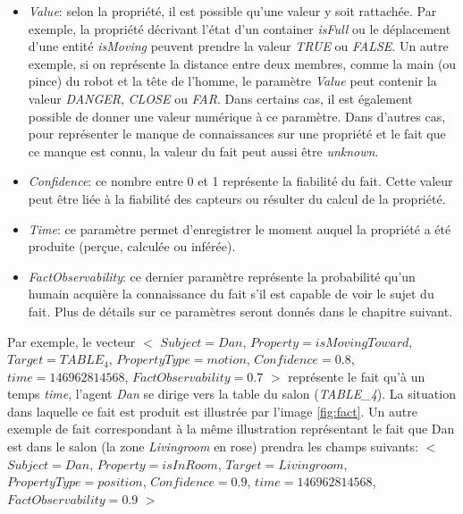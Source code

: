 \documentclass[a4paper,11pt,twoside]{StyleThese}
\begin{document}
\begin{itemize}
\item \textit{Value}: selon la propriété, il est possible qu'une valeur y soit rattachée. Par exemple, la propriété décrivant l'état d'un container \textit{isFull} ou le déplacement d'une entité \textit{isMoving} peuvent prendre la valeur \textit{TRUE} ou \textit{FALSE}. Un autre exemple, si on représente la distance entre deux membres, comme la main (ou pince) du robot et la tête de l'homme, le paramètre \textit{Value} peut contenir la valeur \textit{DANGER}, \textit{CLOSE} ou \textit{FAR}. Dans certains cas, il est également possible de donner une valeur numérique à ce paramètre.
Dans d'autres cas, pour représenter le manque de connaissances sur une propriété et le fait que ce manque est connu, la valeur du fait peut aussi être \textit{unknown}.
\item \textit{Confidence}: ce nombre entre 0 et 1 représente la fiabilité du fait. Cette valeur peut être liée à la fiabilité des capteurs ou résulter du calcul de la propriété.
\item \textit{Time}: ce paramètre permet d'enregistrer le moment auquel la propriété a été produite (perçue, calculée ou inférée).
\item \textit{FactObservability}: ce dernier paramètre représente la probabilité qu'un humain acquière la connaissance du fait s'il est capable de voir le sujet du fait. Plus de détails sur ce paramètres seront donnés dans le chapitre suivant.
\end{itemize}

Par exemple, le vecteur 
$<$ $Subject = Dan$, $Property = isMovingToward$, $Target = TABLE_4$, $PropertyType = motion$, $Confidence = 0.8$, $time = 146962814568$, $FactObservability = 0.7$ $>$ représente le fait qu'à un temps \textit{time}, l'agent \textit{Dan} se dirige vers la table du salon (\textit{TABLE\_4}). La situation dans laquelle ce fait est produit est illustrée par l'image \ref{fig:fact}.
Un autre exemple de fait correspondant à la même illustration représentant le fait que Dan est dans le salon (la zone \textit{Livingroom} en rose) prendra les champs suivants:
$<$ $Subject = Dan$, $Property = isInRoom$, $Target = Livingroom$, $PropertyType = position$, $Confidence = 0.9$, $time = 146962814568$, $FactObservability = 0.9$ $>$
\end{document}
